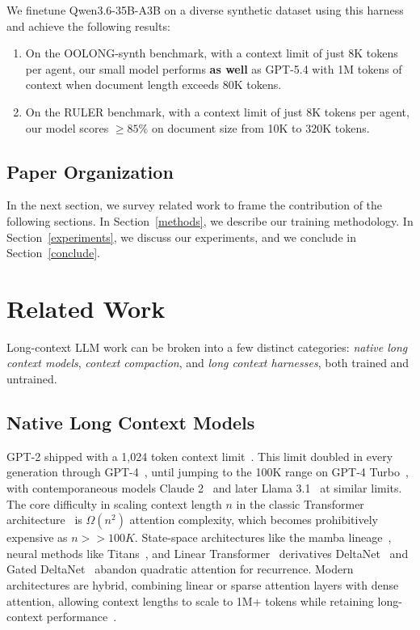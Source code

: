 \documentclass{article} %
\begin{document}
We finetune Qwen3.6-35B-A3B on a diverse synthetic dataset using this harness and achieve the following results:
\begin{enumerate}
  \item On the OOLONG-synth benchmark, with a context limit of just 8K tokens per agent, our small model performs \textbf{as well} as GPT-5.4 with 1M tokens of context when document length exceeds 80K tokens.
  \item On the RULER benchmark, with a context limit of just 8K tokens per agent, our model scores $\geq85\%$ on document size from 10K to 320K tokens.
\end{enumerate}

\subsection{Paper Organization}

In the next section, we survey related work to frame the contribution of the following sections. In Section~\ref{methods}, we describe our training methodology. In Section~\ref{experiments}, we discuss our experiments, and we conclude in Section~\ref{conclude}.

\section{Related Work}
\label{related}

Long-context LLM work can be broken into a few distinct categories: \emph{native long context models}, \emph{context compaction}, and \emph{long context harnesses}, both trained and untrained.

\subsection{Native Long Context Models}

GPT-2 shipped with a 1,024 token context limit~\citep{radford2019gpt2}. This limit doubled in every generation through GPT-4~\citep{brown2020gpt3,openai2022chatgpt,openai2023gpt4}, until jumping to the 100K range on GPT-4 Turbo~\citep{openai2023devday}, with contemporaneous models Claude 2~\citep{anthropic2023claude2} and later Llama 3.1~\citep{grattafiori2024llama3} at similar limits. The core difficulty in scaling context length $n$ in the classic Transformer architecture~\citep{vaswani2017attention} is $\Omega(n^2)$ attention complexity, which becomes prohibitively expensive as $n >> 100K$. State-space architectures like the mamba lineage~\citep{gu2023mamba,dao2024mamba2,lahoti2026mamba3}, neural methods like Titans~\citep{behrouz2024titans}, and Linear Transformer~\citep{katharopoulos2020lineartransformers} derivatives DeltaNet~\citep{schlag2021fastweight} and Gated DeltaNet~\citep{yang2025gateddeltanet} abandon quadratic attention for recurrence. Modern architectures are hybrid, combining linear or sparse attention layers with dense attention, allowing context lengths to scale to 1M+ tokens while retaining long-context performance~\citep{qwen2026qwen35,kimiteam2026kimik3,deepseekai2025deepseekv32,glm5team2026glm5,nvidia2025nemotron3,gemmateam2024gemma2,mistral2024ministral}.
\end{document}
